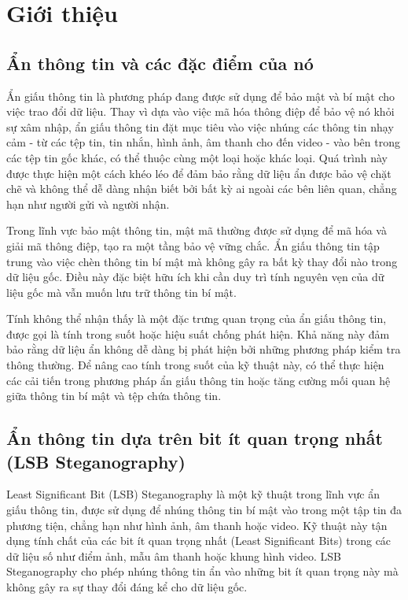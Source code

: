 \chapter{Giới thiệu}
\label{chapter1}
\section{Ẩn thông tin và các đặc điểm của nó}
Ẩn giấu thông tin là phương pháp đang được sử dụng để  bảo mật và bí mật cho việc trao đổi dữ liệu. Thay vì dựa vào việc mã hóa thông điệp để bảo vệ nó khỏi sự xâm nhập, ẩn giấu thông tin đặt mục tiêu vào việc nhúng các thông tin nhạy cảm - từ các tệp tin, tin nhắn, hình ảnh, âm thanh cho đến video - vào bên trong các tệp tin gốc khác, có thể thuộc cùng một loại hoặc khác loại. Quá trình này được thực hiện một cách khéo léo để đảm bảo rằng dữ liệu ẩn được bảo vệ chặt chẽ và không thể dễ dàng nhận biết bởi bất kỳ ai ngoài các bên liên quan, chẳng hạn như người gửi và người nhận.

Trong lĩnh vực bảo mật thông tin, mật mã thường được sử dụng để mã hóa và giải mã thông điệp, tạo ra một tầng bảo vệ vững chắc. Ẩn giấu thông tin tập trung vào việc chèn thông tin bí mật mà không gây ra bất kỳ thay đổi nào trong dữ liệu gốc. Điều này đặc biệt hữu ích khi cần duy trì tính nguyên vẹn của dữ liệu gốc mà vẫn muốn lưu trữ thông tin bí mật.

Tính không thể nhận thấy là một đặc trưng quan trọng của ẩn giấu thông tin, được gọi là tính trong suốt hoặc hiệu suất chống phát hiện. Khả năng này đảm bảo rằng dữ liệu ẩn không dễ dàng bị phát hiện bởi những phương pháp kiểm tra thông thường. Để nâng cao tính trong suốt của kỹ thuật này, có thể thực hiện các cải tiến trong phương pháp ẩn giấu thông tin hoặc tăng cường mối quan hệ giữa thông tin bí mật và tệp chứa thông tin.

\section{Ẩn thông tin dựa trên bit ít quan trọng nhất (LSB Steganography)}

Least Significant Bit (LSB) Steganography là một kỹ thuật trong lĩnh vực ẩn giấu thông tin, được sử dụng để nhúng thông tin bí mật vào trong một tập tin đa phương tiện, chẳng hạn như hình ảnh, âm thanh hoặc video. Kỹ thuật này tận dụng tính chất của các bit ít quan trọng nhất (Least Significant Bits) trong các dữ liệu số như điểm ảnh, mẫu âm thanh hoặc khung hình video. LSB Steganography cho phép nhúng thông tin ẩn vào những bit ít quan trọng này mà không gây ra sự thay đổi đáng kể cho dữ liệu gốc.

